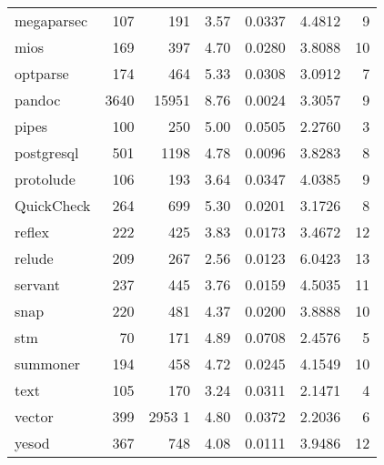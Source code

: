 \documentclass[12pt, a4paper]{article}
\begin{document}
\begin{longtable}[H]{l r r r r r r}
        megaparsec&  107 &   191  & 3.57 & 0.0337 & 4.4812 &  9 \\      
        mios      &  169 &   397  & 4.70 & 0.0280 & 3.8088 & 10 \\      
        optparse  &  174 &   464  & 5.33 & 0.0308 & 3.0912 &  7 \\      
        pandoc    & 3640 & 15951  & 8.76 & 0.0024 & 3.3057 &  9 \\      
        pipes     &  100 &   250  & 5.00 & 0.0505 & 2.2760 &  3 \\      
        postgresql&  501 &  1198  & 4.78 & 0.0096 & 3.8283 &  8 \\      
        protolude &  106 &   193  & 3.64 & 0.0347 & 4.0385 &  9 \\      
        QuickCheck&  264 &   699  & 5.30 & 0.0201 & 3.1726 &  8 \\      
        reflex    &  222 &   425  & 3.83 & 0.0173 & 3.4672 & 12 \\      
        relude    &  209 &   267  & 2.56 & 0.0123 & 6.0423 & 13 \\      
        servant   &  237 &   445  & 3.76 & 0.0159 & 4.5035 & 11 \\      
        snap      &  220 &   481  & 4.37 & 0.0200 & 3.8888 & 10 \\      
        stm       &   70 &   171  & 4.89 & 0.0708 & 2.4576 &  5 \\      
        summoner  &  194 &   458  & 4.72 & 0.0245 & 4.1549 & 10 \\      
        text      &  105 &   170  & 3.24 & 0.0311 & 2.1471 &  4 \\      
        vector    &  399 &  2953 1& 4.80 & 0.0372 & 2.2036 &  6 \\      
        yesod     &  367 &   748  & 4.08 & 0.0111 & 3.9486 & 12     
\end{longtable}
\end{document}
